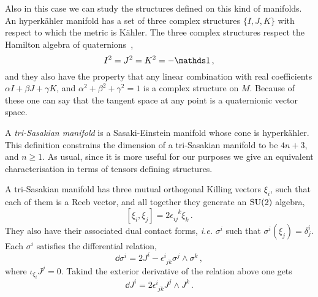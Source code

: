 \documentclass[debug]{phd}
\begin{document}
					Also in this case we can study the structures defined on this kind of manifolds.
					An hyperk\"ahler manifold has a set of three complex structures $\{I, J, K\}$ with respect to which the metric is K\"ahler.
					The three complex structures respect the Hamilton algebra of quaternions~\cite{EncyclMath},
							\begin{equation}
								I^2 = J^2 = K^2 = - \id \, ,
							\end{equation}
					and they also have the property that any linear combination with real coefficients $\alpha I + \beta J + \gamma K$, and $\alpha^2 + \beta^2 + \gamma^2 = 1$ is a complex structure on $M$.
					Because of these one can say that the tangent space at any point is a quaternionic vector space.
					
					A \emph{tri-Sasakian manifold} is a Sasaki-Einstein manifold whose cone is hyperk\"ahler.
					This definition constrains the dimension of a tri-Sasakian manifold to be $4n+3$, and $n \geq 1$.
					As usual, since it is more useful for our purposes we give an equivalent characterisation in terms of tensors defining structures.
					
					A tri-Sasakian manifold has three mutual orthogonal Killing vectors $\xi_i$, such that each of them is a Reeb vector, and all together they generate an $\mathrm{SU}(2)$ algebra,
							\begin{equation}
								\left[\xi_i , \xi_j \right] = 2 \epsilon_{ij}^{\phantom{ij}k} \xi_k \, .
							\end{equation}
					They also have their associated dual contact forms, \emph{i.e.} $\sigma^i$ such that $\sigma^i (\xi_j) = \delta^i_j$.
					Each $\sigma^i$ satisfies the differential relation,
							\begin{equation}
								\dd \sigma^i = 2 J^i - \epsilon_{\phantom{i}jk}^i \sigma^j \wedge \sigma^k \, ,
							\end{equation}
					where $\iota_{\xi_i}J^{j} = 0$.
					Takind the exterior derivative of the relation above one gets
							\begin{equation}
								\dd J^i = 2 \epsilon^{i}_{\phantom{i}jk} J^j \wedge J^k \, .
							\end{equation}
					
\end{document}
